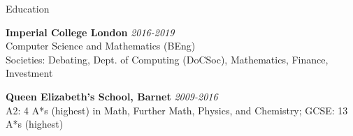 \documentclass[10pt]{resume} %
\begin{document}

\begin{rSection}{Education}

{\bf Imperial College London} \hfill {\em 2016-2019} \\ 
Computer Science and Mathematics (BEng)\smallskip\\
Societies: Debating, Dept. of Computing (DoCSoc), Mathematics, Finance,
Investment

{\bf Queen Elizabeth's School, Barnet} \hfill {\em 2009-2016} \\ 
A2: 4 A*s (highest) in Math, Further Math, Physics, and Chemistry; GCSE: 13 A*s (highest)



\end{rSection}

\end{document}
